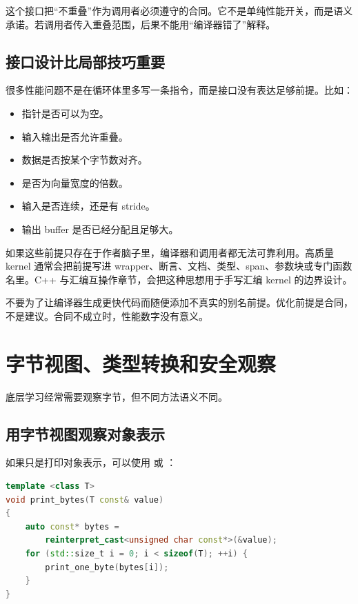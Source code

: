 这个接口把“不重叠”作为调用者必须遵守的合同。它不是单纯性能开关，而是语义承诺。若调用者传入重叠范围，后果不能用“编译器错了”解释。

\subsection{接口设计比局部技巧重要}

很多性能问题不是在循环体里多写一条指令，而是接口没有表达足够前提。比如：

\begin{itemize}
  \item 指针是否可以为空。
  \item 输入输出是否允许重叠。
  \item 数据是否按某个字节数对齐。
  \item {} 是否为向量宽度的倍数。
  \item 输入是否连续，还是有 stride。
  \item 输出 buffer 是否已经分配且足够大。
\end{itemize}

如果这些前提只存在于作者脑子里，编译器和调用者都无法可靠利用。高质量 kernel 通常会把前提写进 wrapper、断言、文档、类型、span、参数块或专门函数名里。C++ 与汇编互操作章节，会把这种思想用于手写汇编 kernel 的边界设计。

\begin{warningbox}
不要为了让编译器生成更快代码而随便添加不真实的别名前提。优化前提是合同，不是建议。合同不成立时，性能数字没有意义。
\end{warningbox}

\section{字节视图、类型转换和安全观察}

底层学习经常需要观察字节，但不同方法语义不同。

\subsection{用字节视图观察对象表示}

如果只是打印对象表示，可以使用  或 ：

\begin{lstlisting}[language=C++]
template <class T>
void print_bytes(T const& value)
{
    auto const* bytes =
        reinterpret_cast<unsigned char const*>(&value);
    for (std::size_t i = 0; i < sizeof(T); ++i) {
        print_one_byte(bytes[i]);
    }
}
\end{lstlisting}

